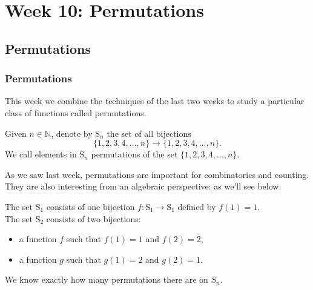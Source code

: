 \documentclass[11pt,dvipsnames]{book}
\numberwithin{figure}{section} %
\numberwithin{table}{section} %
\begin{document}



\part{Week 10: Permutations}




\chapter{Permutations}

\section{Permutations}

This week we combine the techniques of the last two weeks to study a particular class of functions called permutations. 

\begin{definition}
Given $n\in\mathbb{N}$, denote by $\mathrm{S}_{n}$ the set of all bijections
$$
\big\{1,2,3,4,\ldots,n\big\}\longrightarrow\big\{1,2,3,4,\ldots,n\big\}.
$$
 We call elements in $\mathrm{S}_{n}$ \textcolor[rgb]{0.98,0.00,0.00}{permutations} of the set $\{1,2,3,4,\ldots,n\}$.
\end{definition}

As we saw last week, permutations are important for combinatorics and counting. They are also interesting from an algebraic perspective: as we'll see below.


 \begin{example}  
The set $\mathrm{S}_{1}$ consists of one
bijection $f:\mathrm{S}_{1}\rightarrow\mathrm{S}_{1}$ defined by $f(1)=1$.\\

The set $\mathrm{S}_{2}$ consists of two
bijections:
\begin{itemize}%
\item a function $f$ such that $f(1)=1$ and $f(2)=2$,%
\item a function $g$ such that $g(1)=2$ and $g(2)=1$.%
\end{itemize}
\end{example}

We know exactly how many permutations there are on $S_{n}$.
\end{document}
